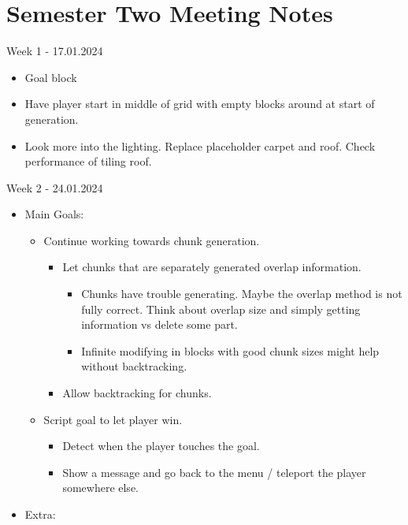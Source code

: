 \section{Semester Two Meeting Notes}
\label{sec:semester_two_meeting_notes}
\noindent Week 1 - 17.01.2024
\begin{itemize}
    \item Goal block
    \item Have player start in middle of grid with empty blocks around at start of generation.
    \item Look more into the lighting. Replace placeholder carpet and roof. Check performance of tiling roof.
\end{itemize}

\noindent Week 2 - 24.01.2024
\begin{itemize}
    \item Main Goals:
          \begin{itemize}
              \item Continue working towards chunk generation.
                    \begin{itemize}
                        \item Let chunks that are separately generated overlap information.
                              \begin{itemize}
                                  \item Chunks have trouble generating. Maybe the overlap method is not fully correct. Think about overlap size and simply getting information vs delete some part.
                                  \item Infinite modifying in blocks with good chunk sizes might help without backtracking.
                              \end{itemize}
                        \item Allow backtracking for chunks.
                    \end{itemize}
              \item Script goal to let player win.
                    \begin{itemize}
                        \item Detect when the player touches the goal.
                        \item Show a message and go back to the menu / teleport the player somewhere else.
                    \end{itemize}
          \end{itemize}
    \item Extra:

\end{itemize}
